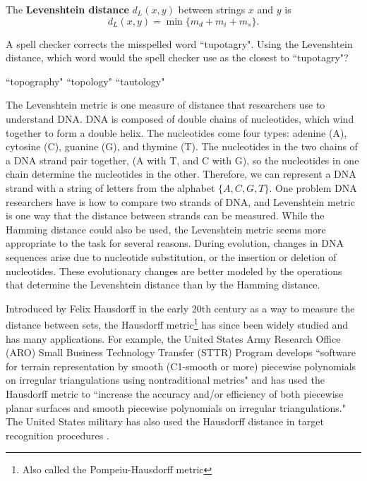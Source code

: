 \begin{definition} The \textbf{Levenshtein distance} $d_L(x,y)$ between strings $x$ and $y$ is 
\[d_L(x,y) = \min\{m_d+m_i+m_s\}.\]
\end{definition}

\begin{activity} A spell checker corrects the misspelled word ``tupotagry". Using the Levenshtein distance, which word would the spell checker use as the closest to ``tupotagry"?
\begin{center} ``topography" \hspace{0.25in} ``topology" \hspace{0.25in} ``tautology" \end{center}

\end{activity}

The Levenshtein metric is one measure of distance that researchers use to understand DNA. DNA is composed of double chains of nucleotides, which wind together to form a double helix. The nucleotides come four types: adenine (A), cytosine (C), guanine (G), and thymine (T). The nucleotides in the two chains of a DNA strand pair together, (A with T, and C with G), so the nucleotides in one chain determine the nucleotides in the other. Therefore, we can represent a DNA strand with a string of letters from the alphabet $\{A, C, G, T\}$. One problem DNA researchers have is how to compare two strands of DNA, and Levenshtein metric is one way that the distance between strands can be measured. While the Hamming distance could also be used, the Levenshtein metric seems more appropriate to the task for several reasons. During evolution, changes in DNA sequences arise due to nucleotide substitution, or the insertion or deletion of nucleotides. These evolutionary changes are better modeled by the operations that determine the Levenshtein distance than by the Hamming distance.  


Introduced by Felix Hausdorff in the early 20th century as a way to measure the distance between sets, the Hausdorff metric\footnote{Also called the Pompeiu-Hausdorff metric} has since been widely studied and has many applications. For example, the United States Army Research Office (ARO) Small Business Technology Transfer (STTR) Program \cite{USArmy} develops ``software for terrain representation by smooth (C1-smooth or more) piecewise polynomials on irregular triangulations using nontraditional metrics" and has used the  Hausdorff metric to ``increase the accuracy and/or efficiency of both piecewise planar surfaces and smooth piecewise polynomials on irregular triangulations."  The United States military has also used the Hausdorff distance in target recognition procedures \cite{Olsen}. 

